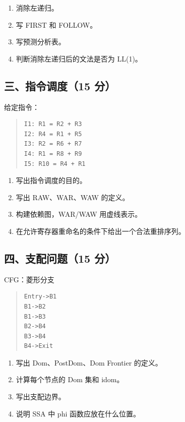 \documentclass[UTF8,zihao=-4]{ctexart}
\begin{document}
\begin{enumerate}
\item 消除左递归。
\item 写 FIRST 和 FOLLOW。
\item 写预测分析表。
\item 判断消除左递归后的文法是否为 LL(1)。
\end{enumerate}


\subsection{三、指令调度（15 分）}


给定指令：


\begin{quote}
\footnotesize
\begin{verbatim}
I1: R1 = R2 + R3
I2: R4 = R1 + R5
I3: R2 = R6 + R7
I4: R1 = R8 + R9
I5: R10 = R4 + R1
\end{verbatim}
\end{quote}


\begin{enumerate}
\item 写出指令调度的目的。
\item 写出 RAW、WAR、WAW 的定义。
\item 构建依赖图，WAR/WAW 用虚线表示。
\item 在允许寄存器重命名的条件下给出一个合法重排序列。
\end{enumerate}


\subsection{四、支配问题（15 分）}


CFG：菱形分支


\begin{quote}
\footnotesize
\begin{verbatim}
Entry->B1
B1->B2
B1->B3
B2->B4
B3->B4
B4->Exit
\end{verbatim}
\end{quote}


\begin{enumerate}
\item 写出 Dom、PostDom、Dom Frontier 的定义。
\item 计算每个节点的 Dom 集和 idom。
\item 写出支配边界。
\item 说明 SSA 中 phi 函数应放在什么位置。
\end{enumerate}
\end{document}
